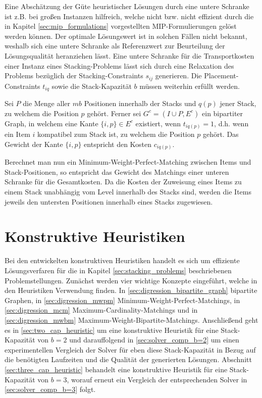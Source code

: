 Eine Abschätzung der Güte heuristischer Lösungen durch eine untere Schranke ist z.B. bei großen Instanzen hilfreich,
welche nicht bzw. nicht effizient durch die in Kapitel \ref{sec:mip_formulations} vorgestellten MIP-Formulierungen gelöst werden können.
Der optimale Lösungswert ist in solchen Fällen nicht bekannt, weshalb sich eine untere Schranke als Referenzwert
zur Beurteilung der Lösungsqualität heranziehen lässt. Eine untere Schranke für die Transportkosten einer Instanz eines Stacking-Problems lässt sich durch eine Relaxation des Problems bezüglich der Stacking-Constraints $s_{ij}$ generieren.
Die Placement-Constraints $t_{iq}$ sowie die Stack-Kapazität $b$ müssen weiterhin erfüllt werden.

Sei $P$ die Menge aller $mb$ Positionen innerhalb der Stacks und $q(p)$ jener Stack, zu welchem die Position $p$ gehört.
Ferner sei $G^c = (I \cup P, E^c)$ ein bipartiter Graph, in welchem eine Kante $\{i, p\} \in E^c$ existiert,
wenn $t_{iq(p)} = 1$, d.h. wenn ein Item $i$ kompatibel zum Stack ist, zu welchem die Position $p$ gehört.
Das Gewicht der Kante $\{i, p\}$ entspricht den Kosten $c_{iq(p)}$.

Berechnet man nun ein Minimum-Weight-Perfect-Matching zwischen Items und Stack-Positionen, so entspricht
das Gewicht des Matchings einer unteren Schranke für die Gesamtkosten. Da die Kosten der Zuweisung eines Items
zu einem Stack unabhängig vom Level innerhalb des Stacks sind, werden die Items jeweils den untersten Positionen
innerhalb eines Stacks zugewiesen.

\vfill

\pagebreak

\section{Konstruktive Heuristiken}
\label{sec:constructive_heuristics}

Bei den entwickelten konstruktiven Heuristiken handelt es sich um effiziente Lösungsverfaren für die in Kapitel \ref{sec:stacking_problems}
beschriebenen Problemstellungen. Zunächst werden vier wichtige Konzepte eingeführt, welche in den Heuristiken Verwendung finden.
In \ref{sec:digression_bipartite_graph} bipartite Graphen, in \ref{sec:digression_mwpm} Minimum-Weight-Perfect-Matchings, in \ref{sec:digression_mcm} Maximum-Cardinality-Matchings und in \ref{sec:digression_mwbm} Maximum-Weight-Bipartite-Matchings. Anschließend geht es in \ref{sec:two_cap_heuristic} um eine konstruktive Heuristik für eine Stack-Kapazität von $b=2$ und darauffolgend in \ref{sec:solver_comp_b=2} um einen experimentellen Vergleich der Solver für eben diese Stack-Kapazität in Bezug auf die benötigten Laufzeiten und die Qualität der generierten Lösungen. Abschnitt \ref{sec:three_cap_heuristic} behandelt eine konstruktive Heuristik für eine Stack-Kapazität von $b=3$, worauf erneut ein Vergleich der entsprechenden Solver in \ref{sec:solver_comp_b=3} folgt.


